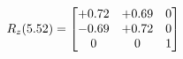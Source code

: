 \documentclass[preview]{standalone}
\begin{document}
\begin{align*}
\special{dvisvgm:raw <g id='unique000'>}R_{z}(5.52) = \begin{bmatrix}+0.72 & +0.69 & 0 \\-0.69 & +0.72 & 0 \\0 & 0 & 1\end{bmatrix}\special{dvisvgm:raw </g>}
\end{align*}
\end{document}
